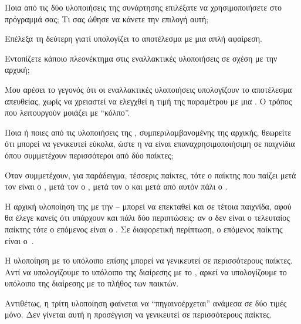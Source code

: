\documentclass[a4paper,11pt,oneside]{book}
\begin{document}
\begin{step}
Ποια από τις δύο υλοποιήσεις της συνάρτησης  επιλέξατε να χρησιμοποιήσετε στο πρόγραμμά σας; Τι σας ώθησε να κάνετε την επιλογή αυτή;

\begin{answer}
Επέλεξα τη δεύτερη γιατί υπολογίζει το αποτέλεσμα με μια απλή αφαίρεση.
\end{answer}

Εντοπίζετε κάποιο πλεονέκτημα στις εναλλακτικές υλοποιήσεις σε σχέση με την αρχική;

\begin{answer}
Μου αρέσει το γεγονός ότι οι εναλλακτικές υλοποιήσεις υπολογίζουν το αποτέλεσμα απευθείας, χωρίς να χρειαστεί να ελεγχθεί η τιμή της παραμέτρου  με μια . Ο τρόπος που λειτουργούν μοιάζει με ``κόλπο''.
\end{answer}

Ποια ή ποιες από τις υλοποιήσεις της , συμπεριλαμβανομένης της αρχικής, θεωρείτε ότι μπορεί να γενικευτεί εύκολα, ώστε η  να είναι επαναχρησιμοποιήσιμη σε παιχνίδια όπου συμμετέχουν περισσότεροι από δύο παίκτες;

\begin{answer}
Όταν συμμετέχουν, για παράδειγμα, τέσσερις παίκτες, τότε ο παίκτης που παίζει μετά τον  είναι ο , μετά τον  ο , μετά τον  ο  και μετά από αυτόν πάλι ο . 

Η αρχική υλοποίηση της  με την -- μπορεί να επεκταθεί και σε τέτοια παιχνίδα, αφού θα έλεγε κανείς ότι υπάρχουν και πάλι δύο περιπτώσεις: αν ο  δεν είναι ο τελευταίος παίκτης τότε ο επόμενος είναι ο . Σε διαφορετική περίπτωση, ο επόμενος παίκτης είναι ο~. 

Η υλοποίηση με το υπόλοιπο επίσης μπορεί να γενικευτεί σε περισσότερους παίκτες. Αντί να υπολογίζουμε το υπόλοιπο της διαίρεσης με το , αρκεί να υπολογίζουμε το υπόλοιπο της διαίρεσης με το πλήθος των παικτών.

Αντιθέτως, η τρίτη υλοποίηση φαίνεται να ``πηγαινοέρχεται'' ανάμεσα σε δύο τιμές μόνο. Δεν γίνεται αυτή η προσέγγιση να γενικευτεί σε περισσότερους παίκτες.
\end{answer}
\end{step}
\end{document}
